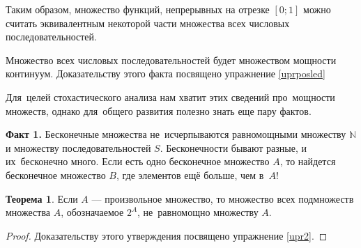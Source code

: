 \documentclass[pdftex, 12pt, a4paper]{article}
\def \mbb{\mathbb}
\def \N{\mbb N}
\theoremstyle{definition} %
\newtheorem{myth}{Теорема}
\numberwithin{problem}{section}
\numberwithin{blits}{section}
\begin{document}
\begin{itemize}
\begin{itemize}
\begin{center}
\end{center}

 Таким образом, множество функций, непрерывных на отрезке $[0;1]$ можно считать эквивалентным некоторой части множества всех числовых последовательностей.

Множество всех числовых последовательностей будет множеством мощности континуум. Доказательству этого факта посвящено упражнение \ref{uprposled}

\end{itemize}
\end{itemize}


Для~целей стохастического анализа нам хватит этих сведений про~мощности множеств, однако для~общего развития полезно знать еще пару фактов.

\textbf{Факт 1.} Бесконечные множества не~исчерпываются равномощными множеству $\N$ и множеству последовательностей $S$. Бесконечности бывают разные, и их~бесконечно много. Если есть одно бесконечное множество $A$, то найдется бесконечное множество $B$, где элементов ещё больше, чем в~$A$!

\begin{myth} Если $A$ --- произвольное множество, то множество всех подмножеств множества $A$, обозначаемое $2^{A}$, не~равномощно множеству $A$.
\end{myth}
\begin{proof} Доказательству этого утверждения посвящено упражнение \ref{upr2}.
\end{proof}
\end{document}
